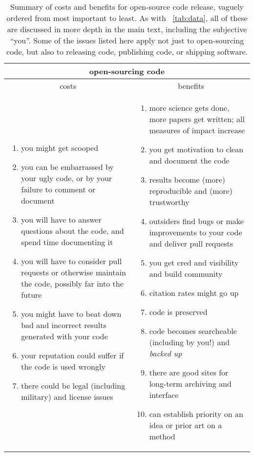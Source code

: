 \documentclass[12pt,twoside,pdftex]{article}
\begin{document}
\begin{table}%
\begin{tabular}{@{}p{\cwidth}|p{\cwidth}@{}}%
\multicolumn{2}{c}{\textbf{open-sourcing code}} \\ \hline
\multicolumn{1}{c|}{costs} & \multicolumn{1}{c}{benefits} \\ \hline
\begin{enumerate}\raggedright
\item you might get scooped
\item you can be embarrassed by your ugly code, or by your failure to comment or document
\item you will have to answer questions about the code, and spend time documenting it
\item you will have to consider pull requests or otherwise maintain the code, possibly far into the future
\item you might have to beat down bad and incorrect results generated with your code
\item your reputation could suffer if the code is used wrongly
\item there could be legal (including military) and license issues
\end{enumerate}&\begin{enumerate}\raggedright
\item more science gets done, more papers get written; all measures of impact increase
\item you get motivation to clean and document the code
\item results become (more) reproducible and (more) trustworthy
\item outsiders find bugs or make improvements to your code and deliver pull requests
\item you get cred and visibility and build community
\item citation rates might go up
\item code is preserved
\item code becomes searcheable (including by you!) and \emph{backed up}
\item there are good sites for long-term archiving and interface
\item can establish priority on an idea or prior art on a method
\end{enumerate}\end{tabular}
\caption{Summary of costs and benefits for open-source code release,
  vaguely ordered from most important to least. As with
  \tablename~\ref{tab:data}, all of these are discussed in more depth
  in the main text, including the subjective ``you''. Some of the
  issues listed here apply not just to open-sourcing code, but also to
  releasing code, publishing code, or shipping
  software.\label{tab:code}}
\end{table}
\end{document}
